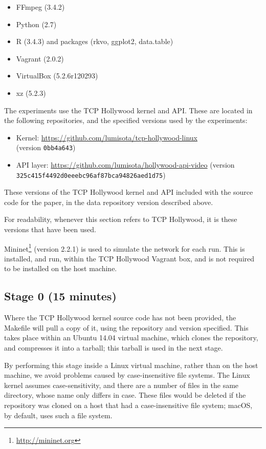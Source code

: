 \documentclass[sigconf]{acmart}
\begin{document}
\begin{itemize}
\item FFmpeg (3.4.2)
\item Python (2.7)
\item R (3.4.3) and packages (rkvo, ggplot2, data.table)
\item Vagrant (2.0.2)
\item VirtualBox (5.2.6r120293)
\item xz (5.2.3)
\end{itemize}

The experiments use the TCP Hollywood kernel and API. These are located in the following
repositories, and the specified versions used by the experiments:

\begin{itemize}
\item Kernel: \url{https://github.com/lumisota/tcp-hollywood-linux} \\ (version \texttt{0bb4a643})
\item API layer: \url{https://github.com/lumisota/hollywood-api-video} (version \texttt{325c415f4492d0eeebc96af87bca94826aed1d75})
\end{itemize}

These versions of the TCP Hollywood kernel and API included with the source code for the
paper, in the data repository version described above.

For readability, whenever this section refers to TCP Hollywood, it is these versions that
have been used.

Mininet\footnote{\url{http://mininet.org}} (version 2.2.1) is used to simulate the network
for each run. This is installed, and run, within the TCP Hollywood Vagrant box, and is
not required to be installed on the host machine.

\subsection*{Stage 0 (15 minutes)}

Where the TCP Hollywood kernel source code has not been provided, the Makefile will pull
a copy of it, using the repository and version specified. This takes place within an
Ubuntu 14.04 virtual machine, which clones the repository, and compresses it into a 
tarball; this tarball is used in the next stage.

By performing this stage inside a Linux virtual machine, rather than on the host
machine, we avoid problems caused by case-insensitive file systems. The Linux kernel
assumes case-sensitivity, and there are a number of files in the same directory, whose
name only differs in case. These files would be deleted if the repository was cloned on
a host that had a case-insensitive file system; macOS, by default, uses such a file system.
\end{document}
